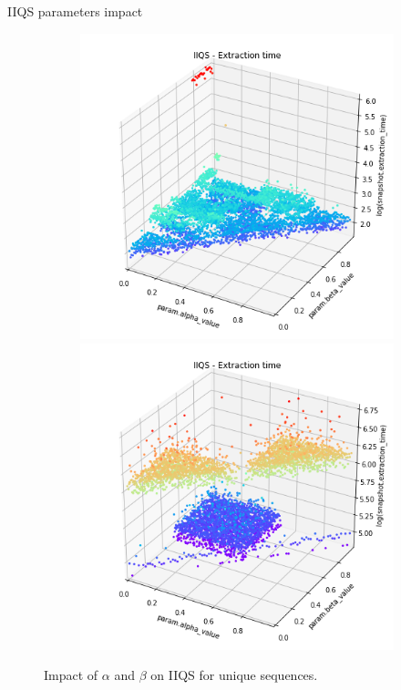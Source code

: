 \documentclass{beamer}
\begin{document}
\begin{frame}{IIQS parameters impact}
\begin{figure}
\begin{subfigure}[b]{\textwidth}
            \includegraphics[height=0.38\textheight]{chapter4/04-alphabeta-noclass-desc.png.0-0.png}
            \includegraphics[height=0.38\textheight]{chapter4/04-alpabeta-singleclass.png.1-0.png}
        \end{subfigure}
        \caption{Impact of $\alpha$ and $\beta$ on IIQS for unique sequences.}
    \end{figure}


\end{frame}
\end{document}
